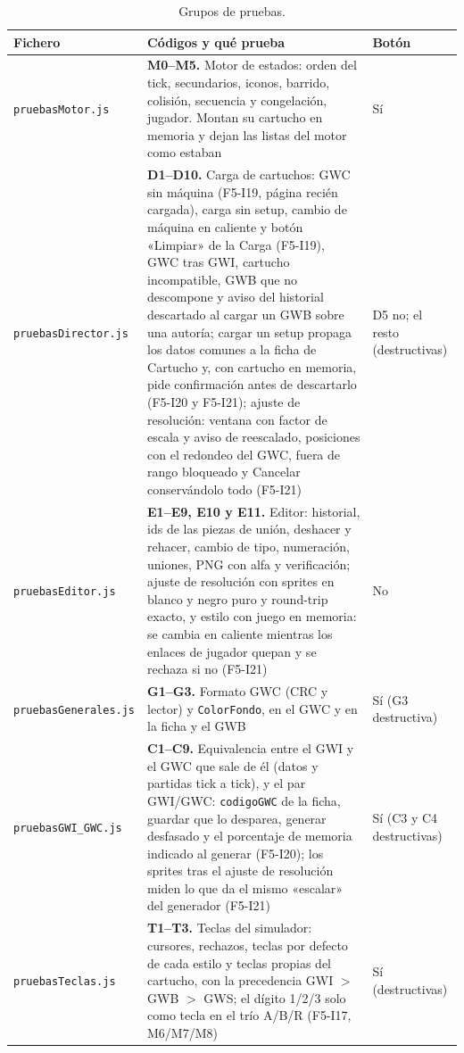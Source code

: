 \begin{table}[H]
	\centering
	\begin{tabularx}{\textwidth}{l >{\RaggedRight\arraybackslash}X >{\RaggedRight\arraybackslash}p{2.3cm}}
		\toprule
		\textbf{Fichero} & \textbf{Códigos y qué prueba} & \textbf{Botón} \\
		\midrule
		\texttt{pruebasMotor.js} & \textbf{M0--M5.} Motor de estados: orden del tick, secundarios, iconos, barrido, colisión, secuencia y congelación, jugador. Montan su cartucho en memoria y dejan las listas del motor como estaban & Sí \\
		\midrule
		\texttt{pruebasDirector.js} & \textbf{D1--D10.} Carga de cartuchos: GWC sin máquina (F5-I19, página recién cargada), carga sin setup, cambio de máquina en caliente y botón «Limpiar» de la Carga (F5-I19), GWC tras GWI, cartucho incompatible, GWB que no descompone y aviso del historial descartado al cargar un GWB sobre una autoría; cargar un setup propaga los datos comunes a la ficha de Cartucho y, con cartucho en memoria, pide confirmación antes de descartarlo (F5-I20 y F5-I21); ajuste de resolución: ventana con factor de escala y aviso de reescalado, posiciones con el redondeo del GWC, fuera de rango bloqueado y Cancelar conservándolo todo (F5-I21) & D5 no; el resto (destructivas) \\
		\midrule
		\texttt{pruebasEditor.js} & \textbf{E1--E9, E10 y E11.} Editor: historial, ids de las piezas de unión, deshacer y rehacer, cambio de tipo, numeración, uniones, PNG con alfa y verificación; ajuste de resolución con sprites en blanco y negro puro y round-trip exacto, y estilo con juego en memoria: se cambia en caliente mientras los enlaces de jugador quepan y se rechaza si no (F5-I21) & No \\
		\midrule
		\texttt{pruebasGenerales.js} & \textbf{G1--G3.} Formato GWC (CRC y lector) y \texttt{ColorFondo}, en el GWC y en la ficha y el GWB & Sí (G3 destructiva) \\
		\midrule
		\texttt{pruebasGWI\_GWC.js} & \textbf{C1--C9.} Equivalencia entre el GWI y el GWC que sale de él (datos y partidas tick a tick), y el par GWI/GWC: \texttt{codigoGWC} de la ficha, guardar que lo desparea, generar desfasado y el porcentaje de memoria indicado al generar (F5-I20); los sprites tras el ajuste de resolución miden lo que da el mismo «escalar» del generador (F5-I21) & Sí (C3 y C4 destructivas) \\
		\midrule
		\texttt{pruebasTeclas.js} & \textbf{T1--T3.} Teclas del simulador: cursores, rechazos, teclas por defecto de cada estilo y teclas propias del cartucho, con la precedencia GWI $>$ GWB $>$ GWS; el dígito 1/2/3 solo como tecla en el trío A/B/R (F5-I17, M6/M7/M8) & Sí (destructivas) \\
		\bottomrule
	\end{tabularx}
	\caption{Grupos de pruebas.}
\end{table}


